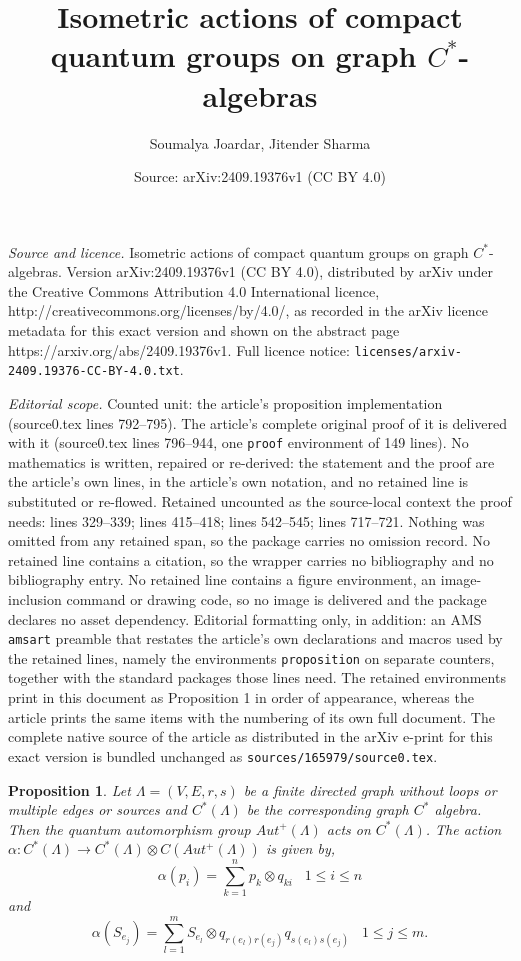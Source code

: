 \documentclass[10pt,a4paper]{amsart}
\title{Isometric actions of compact quantum groups on graph $C^{\ast}$-algebras}
\author{Soumalya Joardar, Jitender Sharma}
\date{Source: arXiv:2409.19376v1 (CC BY 4.0)}
\newtheorem{proposition}{Proposition}
\newcommand{\raro}{\rightarrow}
\begin{document}
\maketitle

\noindent\emph{Source and licence.} Isometric actions of compact quantum groups on graph $C^{\ast}$-algebras. Version arXiv:2409.19376v1 (CC BY 4.0), distributed by arXiv under the Creative Commons Attribution 4.0 International licence, http://creativecommons.org/licenses/by/4.0/, as recorded in the arXiv licence metadata for this exact version and shown on the abstract page https://arxiv.org/abs/2409.19376v1. Full licence notice: \texttt{licenses/arxiv-2409.19376-CC-BY-4.0.txt}.\par\smallskip

\noindent\textit{Editorial scope.} Counted unit: the article's proposition implementation (source0.tex lines 792--795). The article's complete original proof of it is delivered with it (source0.tex lines 796--944, one \texttt{proof} environment of 149 lines). No mathematics is written, repaired or re-derived: the statement and the proof are the article's own lines, in the article's own notation, and no retained line is substituted or re-flowed.  Retained uncounted as the source-local context the proof needs: lines 329--339; lines 415--418; lines 542--545; lines 717--721.  Nothing was omitted from any retained span, so the package carries no omission record.  No retained line contains a citation, so the wrapper carries no bibliography and no bibliography entry.  No retained line contains a figure environment, an image-inclusion command or drawing code, so no image is delivered and the package declares no asset dependency.  Editorial formatting only, in addition: an AMS \texttt{amsart} preamble that restates the article's own declarations and macros used by the retained lines, namely the environments \texttt{proposition} on separate counters, together with the standard packages those lines need.  The retained environments print in this document as Proposition 1 in order of appearance, whereas the article prints the same items with the numbering of its own full document.  The complete native source of the article as distributed in the arXiv e-print for this exact version is bundled unchanged as \texttt{sources/165979/source0.tex}.
\begin{proposition}
\label{actionofqaut}
Let $\Lambda=(V,E,r,s)$ be a finite directed graph without loops or multiple edges or sources and $C^{\ast}(\Lambda)$ be the corresponding graph $C^{\ast}$ algebra. Then the quantum automorphism group $Aut^{+}(\Lambda)$ acts on $C^{\ast}(\Lambda)$. The action $\alpha:C^{\ast}(\Lambda)\raro C^{\ast}(\Lambda)\otimes C(Aut^{+}(\Lambda))$ is given by, 
\begin{equation*}
   \alpha(p_{i})=\sum\limits_{k=1}^{n}p_{k}\otimes q_{ki}\;\;\;  1\leq i\leq n
\end{equation*}
and 
\begin{equation*}
   \alpha(S_{e_{j}})=\sum\limits_{l=1}^{m}S_{e_{l}}\otimes q_{r(e_{l})r(e_{j})}q_{s(e_{l})s(e_{j})} \;\;\; 1\leq j\leq m.
\end{equation*}
\end{proposition}
\end{document}
